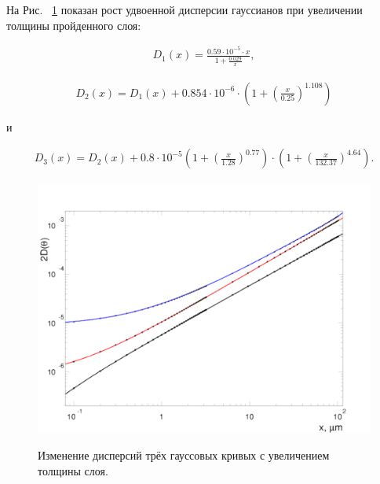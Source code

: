 \documentclass[a4paper,12pt]{article}
\begin{document}
\begin{large}
	На Рис. ~\ref{fig:DispTheta} показан рост удвоенной дисперсии гауссианов при увеличении толщины пройденного слоя:

\begin{equation}
\label{MSApproximationD1}
\begin{aligned} 
D_1(x)=\frac{0.59\cdot 10^{-5}\cdot x}{1+\frac{0.029}{x}}, 
\end{aligned}
\end{equation}

\begin{equation}
\label{MSApproximationD2}
\begin{aligned} 
D_2(x)=D_1(x)+0.854\cdot 10^{-6}\cdot\left( 1+\left(\frac{x}{0.25} \right)^{1.108}\right)
\end{aligned}
\end{equation}

и

\begin{equation}
\label{MSApproximationD3}
\begin{aligned} 
D_3(x)=D_2(x)+0.8\cdot 10^{-5}\left( 1+\left(\frac{x}{1.28} \right)^{0.77}\right)\cdot\left( 1+\left(\frac{x}{132.37} \right)^{4.64}\right).
\end{aligned}
\end{equation}

\begin{figure}[ht]
  {
     \includegraphics[width=0.99\linewidth]{images/pars246}
  }
  \caption{Изменение дисперсий трёх гауссовых кривых с увеличением толщины слоя.}
  \label{fig:DispTheta}
\end{figure}


\end{large}
\end{document}
